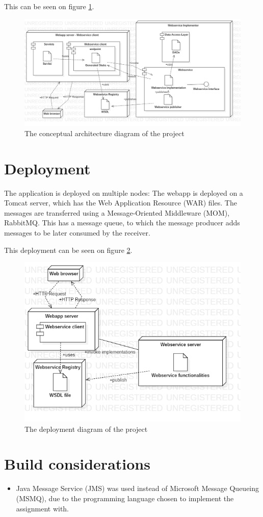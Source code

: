 \documentclass[a4paper,10pt]{report}
\begin{document}
This can be seen on figure \ref{fig:architecture_diagram}.

\begin{figure}[h]
    \centering
    \includegraphics[width=1\textwidth]{architecture_diagram.png}
    \caption{The conceptual architecture diagram of the project}
    \label{fig:architecture_diagram}
\end{figure}

\section{Deployment}
The application is deployed on multiple nodes:
The webapp is deployed on a Tomcat server, which has the Web Application Resource (WAR) files.
The messages are transferred using a Message-Oriented Middleware (MOM), RabbitMQ. This has a message queue, to which the message producer adds messages to be later consumed by the receiver.

This deployment can be seen on figure \ref{fig:deployment_diagram}.

\begin{figure}[h]
    \centering
    \includegraphics[width=1\textwidth]{deployment_diagram.png}
    \caption{The deployment diagram of the project}
    \label{fig:deployment_diagram}
\end{figure}

\section{Build considerations}
\begin{itemize}
    \item Java Message Service (JMS) was used instead of Microsoft Message Queueing (MSMQ), due to the programming language chosen to implement the assignment with.
\end{itemize}
\end{document}
